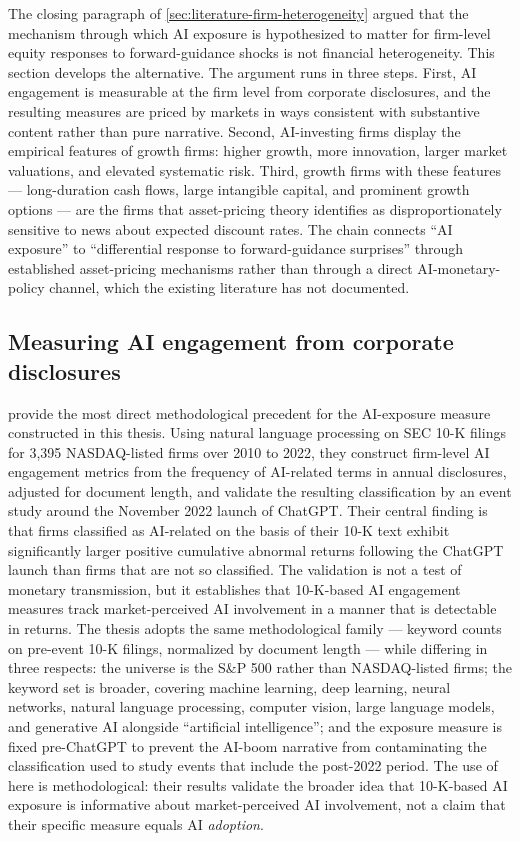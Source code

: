 The closing paragraph of \cref{sec:literature-firm-heterogeneity}
argued that the mechanism through which AI exposure is hypothesized
to matter for firm-level equity responses to forward-guidance shocks
is not financial heterogeneity. This section develops the alternative.
The argument runs in three steps. First, AI engagement is measurable
at the firm level from corporate disclosures, and the resulting
measures are priced by markets in ways consistent with substantive
content rather than pure narrative. Second, AI-investing firms display
the empirical features of growth firms: higher growth, more innovation,
larger market valuations, and elevated systematic risk. Third, growth
firms with these features --- long-duration cash flows, large intangible
capital, and prominent growth options --- are the firms that
asset-pricing theory identifies as disproportionately sensitive to
news about expected discount rates. The chain connects ``AI exposure''
to ``differential response to forward-guidance surprises'' through
established asset-pricing mechanisms rather than through a direct
AI-monetary-policy channel, which the existing literature has not
documented.

\subsection*{Measuring AI engagement from corporate disclosures}

 provide the most direct methodological precedent
for the AI-exposure measure constructed in this thesis. Using natural
language processing on SEC 10-K filings for 3{,}395 NASDAQ-listed
firms over 2010 to 2022, they construct firm-level AI engagement
metrics from the frequency of AI-related terms in annual disclosures,
adjusted for document length, and validate the resulting classification
by an event study around the November 2022 launch of ChatGPT. Their
central finding is that firms classified as AI-related on the basis
of their 10-K text exhibit significantly larger positive cumulative
abnormal returns following the ChatGPT launch than firms that are not
so classified. The validation is not a test of monetary transmission,
but it establishes that 10-K-based AI engagement measures track
market-perceived AI involvement in a manner that is detectable in
returns. The thesis adopts the same methodological family --- keyword
counts on pre-event 10-K filings, normalized by document length ---
while differing in three respects: the universe is the S\&P 500 rather
than NASDAQ-listed firms; the keyword set is broader, covering
machine learning, deep learning, neural networks, natural language
processing, computer vision, large language models, and generative
AI alongside ``artificial intelligence''; and the exposure measure is
fixed pre-ChatGPT to prevent the AI-boom narrative from contaminating
the classification used to study events that include the post-2022
period. The use of \citet{anteSaggu2025} here is methodological:
their results validate the broader idea that 10-K-based AI exposure is
informative about market-perceived AI involvement, not a claim that
their specific measure equals AI \emph{adoption}.


